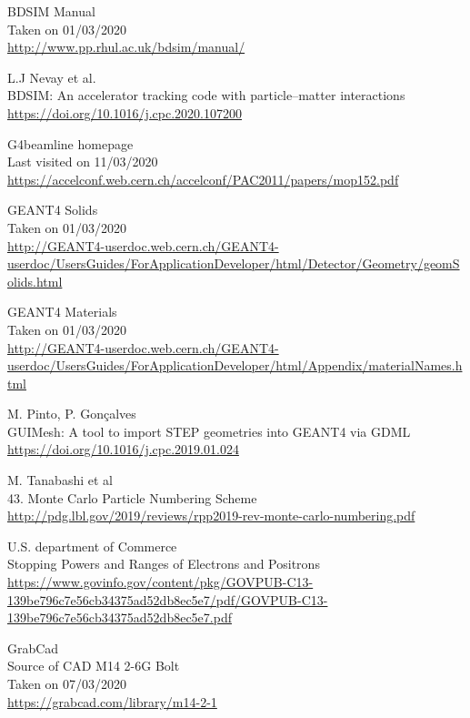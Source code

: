 \documentclass[12pt,a4paper]{article}
\begin{document}
\begin{thebibliography}{1}
	\bibitem{}
		BDSIM Manual\\
		Taken on 01/03/2020\\
		\url{http://www.pp.rhul.ac.uk/bdsim/manual/}
		
		L.J Nevay et al.\\
		BDSIM: An accelerator tracking code with particle–matter interactions\\
		\url{https://doi.org/10.1016/j.cpc.2020.107200}

	
	G4beamline homepage\\
	Last visited on 11/03/2020\\
	\url{https://accelconf.web.cern.ch/accelconf/PAC2011/papers/mop152.pdf}
	
		
	GEANT4 Solids\\
	Taken on 01/03/2020\\
	\url{http://GEANT4-userdoc.web.cern.ch/GEANT4-userdoc/UsersGuides/ForApplicationDeveloper/html/Detector/Geometry/geomSolids.html}
	
	GEANT4 Materials\\
	Taken on 01/03/2020\\
	\url{http://GEANT4-userdoc.web.cern.ch/GEANT4-userdoc/UsersGuides/ForApplicationDeveloper/html/Appendix/materialNames.html}
	
	M. Pinto, P. Gon\c{c}alves\\
	GUIMesh: A tool to import STEP geometries into GEANT4 via GDML\\
	\url{https://doi.org/10.1016/j.cpc.2019.01.024}
		
	M. Tanabashi et al\\
	43. Monte Carlo Particle Numbering Scheme\\
	\url{http://pdg.lbl.gov/2019/reviews/rpp2019-rev-monte-carlo-numbering.pdf}
	
	U.S. department of Commerce\\
	Stopping Powers and Ranges of
	Electrons and Positrons\\
	\url{https://www.govinfo.gov/content/pkg/GOVPUB-C13-139be796c7e56cb34375ad52db8ec5e7/pdf/GOVPUB-C13-139be796c7e56cb34375ad52db8ec5e7.pdf}
	
	GrabCad\\
	Source of CAD M14 2-6G Bolt\\
	Taken on 07/03/2020\\
	\url{https://grabcad.com/library/m14-2-1}


\end{thebibliography}
\end{document}
